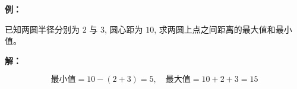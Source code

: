 \begin{examplebox}
\textbf{例：}

已知两圆半径分别为 $2$ 与 $3$,
圆心距为 $10$,
求两圆上点之间距离的最大值和最小值。

\textbf{解：}

\[
\text{最小值}=10-(2+3)=5,
\quad
\text{最大值}=10+2+3=15
\]
\end{examplebox}
